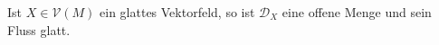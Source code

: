 \begin{satz}
  Ist $X \in \mathcal V(M)$ ein glattes Vektorfeld, so ist $\mathcal D_X$ eine offene Menge und sein Fluss glatt.
\end{satz}

